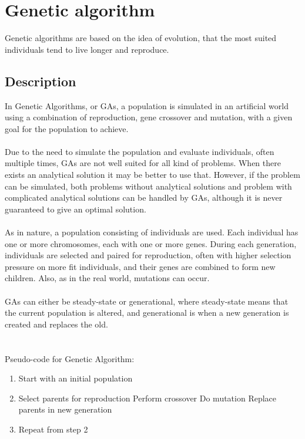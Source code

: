 \section{Genetic algorithm}
Genetic algorithms are based on the idea of evolution, that the most suited individuals tend to live longer and reproduce. 
\subsection{Description}
In Genetic Algorithms, or GAs, a population is simulated in an artificial world using a combination of reproduction, gene crossover and mutation, with a given goal for the population to achieve.\cite{GAHandbook1}\\
\\
Due to the need to simulate the population and evaluate individuals, often multiple times, GAs are not well suited for all kind of problems. When there exists an analytical solution it may be better to use that. However, if the problem can be simulated, both problems without analytical solutions and problem with complicated analytical solutions can be handled by GAs, although it is never guaranteed to give an optimal solution.\\
\\
As in nature, a population consisting of individuals are used. Each individual has one or more chromosomes, each with one or more genes. During each generation, individuals are selected and paired for reproduction, often with higher selection pressure on more fit individuals, and their genes are combined to form new children. Also, as in the real world, mutations can occur.\\
\\
GAs can either be steady-state or generational, where steady-state means that the current population is altered, and generational is when a new generation is created and replaces the old.\\
\\ 
\\Pseudo-code for Genetic Algorithm:
\begin{enumerate}
\item Start with an initial population
\item Select parents for reproduction
\subitem Perform crossover
\subitem Do mutation
\subitem Replace parents in new generation
\item Repeat from step 2
\end{enumerate}
